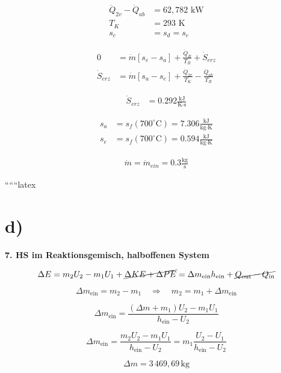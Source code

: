 \begin{align*}
\dot{Q}_{2v} - \dot{Q}_{ab} &= 62,782 \text{ kW} \\
T_K &= 293 \text{ K} \\
s_c &= s_d = s_e
\end{align*}

\begin{align*}
0 &= \dot{m} \left[ s_e - s_a \right] + \frac{\dot{Q}_R}{T_R} + \dot{S}_{erz} \\
\dot{S}_{erz} &= \dot{m} \left[ s_a - s_e \right] + \frac{\dot{Q}_{2v}}{T_K} - \frac{\dot{Q}_{ab}}{T_R}
\end{align*}

\begin{align*}
\dot{S}_{erz} &= 0.292 \frac{\text{kJ}}{\text{K} \cdot \text{s}}
\end{align*}

\begin{align*}
s_a &= s_f (700^\circ \text{C}) = 7.306 \frac{\text{kJ}}{\text{kg} \cdot \text{K}} \\
s_e &= s_f (700^\circ \text{C}) = 0.594 \frac{\text{kJ}}{\text{kg} \cdot \text{K}}
\end{align*}

\begin{align*}
\dot{m} = \dot{m}_{ein} = 0.3 \frac{\text{kg}}{\text{s}}
\end{align*}

``````latex


\section*{d)}

\textbf{7. HS im Reaktionsgemisch, halboffenen System}

\[
\Delta E = m_2 U_2 - m_1 U_1 + \cancel{ \Delta KE + \Delta PE } = \Delta m_{\text{ein}} h_{\text{ein}} + \cancel{Q_{\text{out}} - Q_{\text{in}}}
\]

\[
\Delta m_{\text{ein}} = m_2 - m_1 \quad \Rightarrow \quad m_2 = m_1 + \Delta m_{\text{ein}}
\]

\[
\Delta m_{\text{ein}} = \frac{( \Delta m + m_1 ) U_2 - m_1 U_1}{h_{\text{ein}} - U_2}
\]

\[
\Delta m_{\text{ein}} = \frac{m_2 U_2 - m_1 U_1}{h_{\text{ein}} - U_2} = m_1 \frac{U_2 - U_1}{h_{\text{ein}} - U_2}
\]

\[
\Delta m = 3 \, 469,69 \, \text{kg}
\]

